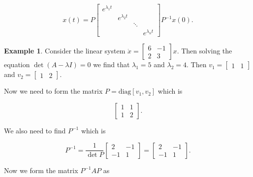 \documentclass[12pt]{article}
\theoremstyle{definition}
\newtheorem*{example}{Example}
\begin{document}
\begin{equation*}
x(t) = P
\begin{bmatrix}
e^{\lambda_1 t} & & \\
& e^{\lambda_2 t} & \\
& & \ddots & \\
& & & e^{\lambda_n t}
\end{bmatrix}
P^{-1}x(0).
\end{equation*}

\begin{example}
Consider the linear system $\dot x = \begin{bmatrix} 6 & -1 \\ 2 & 3 \end{bmatrix} x$. Then solving the equation $\det (A - \lambda I) = 0$
we find that $\lambda_1 = 5$ and $\lambda_2 = 4$. Then $v_1 = \begin{bmatrix} 1 & 1 \end{bmatrix}$ and 
$v_2 = \begin{bmatrix} 1 & 2 \end{bmatrix}$.

Now we need to form the matrix $P = \text{diag}[v_1, v_2]$ which is

\[
\begin{bmatrix}
1 & 1 \\
1 & 2
\end{bmatrix}.
\] 

We also need to find $P^{-1}$ which is

\[
P^{-1} = \dfrac{1}{\det P} \begin{bmatrix} 2 & -1 \\ -1 & 1 \end{bmatrix} = \begin{bmatrix} 2 & -1 \\ -1 & 1 \end{bmatrix}.
\]


Now we form the matrix $P^{-1}AP$ as


\end{example}
\end{document}
